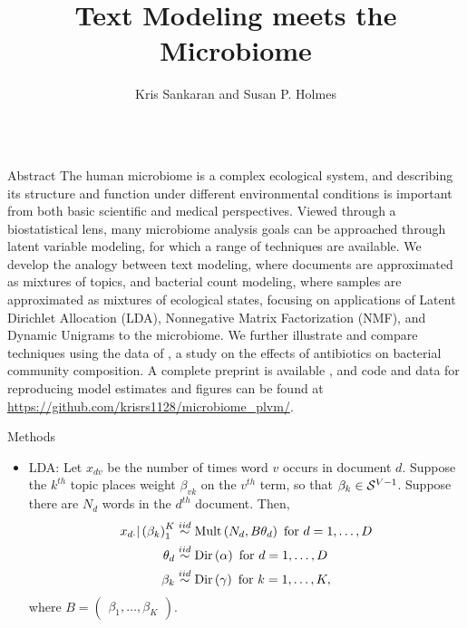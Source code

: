 \documentclass[final, 8pt]{beamer}
\title{Text Modeling meets the Microbiome}
\author{Kris Sankaran and Susan P. Holmes}
\institute{Department of Statistics, Stanford University}
\newlength{\onecolwid}
\begin{document}
\begin{frame}

\begin{columns}
\begin{column}{\onecolwid}

\begin{block}{Abstract}
The human microbiome is a complex ecological system, and describing its
structure and function under different environmental conditions is important
from both basic scientific and medical perspectives. Viewed through a
biostatistical lens, many microbiome analysis goals can be approached through
latent variable modeling, for which a range of techniques are available. We
develop the analogy between text modeling, where documents are approximated as
mixtures of topics, and bacterial count modeling, where samples are approximated
as mixtures of ecological states, focusing on applications of Latent Dirichlet
Allocation (LDA), Nonnegative Matrix Factorization (NMF), and Dynamic Unigrams
to the microbiome. We further illustrate and compare techniques using the data
of \citep{dethlefsen2011incomplete}, a study on the effects of antibiotics on
bacterial community composition. A complete preprint is available
\citep{sankaran2017latent}, and code and data for reproducing model estimates
and figures can be found at
\url{https://github.com/krisrs1128/microbiome_plvm/}.
\end{block}

\begin{block}{Methods}
  \begin{itemize}
\item LDA: Let $x_{dv}$ be the number of times word $v$
  occurs in document $d$. Suppose the $k^{th}$ topic places weight $\beta_{vk}$
  on the $v^{th}$ term, so that $\beta_{k} \in \mathcal{S}^{V - 1}$. Suppose there
  are $N_{d}$ words in the $d^{th}$ document. Then,
\begin{align*}
x_{d\cdot} \vert \left(\beta_{k}\right)_{1}^{K} &\overset{iid}{\sim} \textnormal{Mult}\left(N_{d}, B\theta_{d}\right) \text{ for } d = 1, \dots, D\\
\theta_{d} &\overset{iid}{\sim} \textnormal{Dir}\left(\alpha\right) \text{ for } d = 1, \dots, D \\
\beta_{k} &\overset{iid}{\sim} \textnormal{Dir}\left(\gamma\right) \text{ for }k = 1, \dots, K,
\end{align*}
where $B = \begin{pmatrix}\beta_{1}, \dots, \beta_{K}\end{pmatrix}$.


\end{itemize}
\end{block}
\end{column}
\end{columns}
\end{frame}
\end{document}
